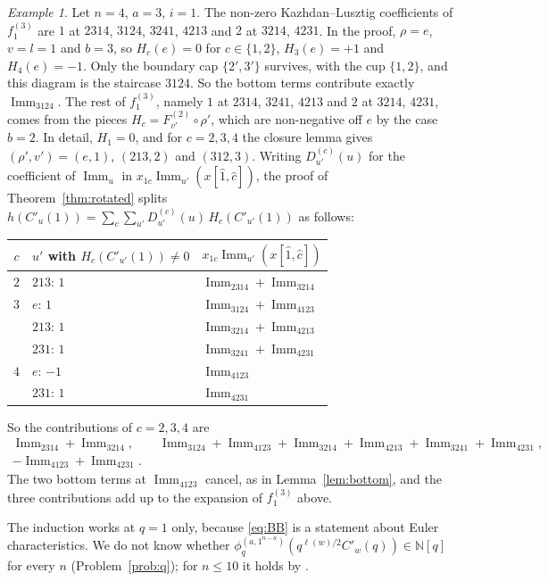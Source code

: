 \documentclass[11pt]{amsart}
\theoremstyle{definition}
\theoremstyle{remark}
\newtheorem{exa}{Example}[section]
\newcommand{\N}{\mathbb{N}}
\newcommand{\Imm}{\operatorname{Imm}}
\newcommand{\Cp}[1]{C'_{#1}(1)}
\begin{document}
\begin{exa}\label{ex:n4}
Let $n=4$, $a=3$, $i=1$. The non-zero Kazhdan--Lusztig coefficients of $f^{(3)}_1$ are $1$ at $2314$, $3124$, $3241$, $4213$ and $2$ at $3214$, $4231$. In the proof, $\rho=e$, $v=l=1$ and $b=3$, so $H_c(e)=0$ for $c\in\{1,2\}$, $H_3(e)=+1$ and $H_4(e)=-1$. Only the boundary cap $\{2',3'\}$ survives, with the cup $\{1,2\}$, and this diagram is the staircase $3124$. So the bottom terms contribute exactly $\Imm_{3124}$. The rest of $f^{(3)}_1$, namely $1$ at $2314$, $3241$, $4213$ and $2$ at $3214$, $4231$, comes from the pieces $H_c=F^{(2)}_{v'}\circ\rho'$, which are non-negative off $e$ by the case $b=2$. In detail, $H_1=0$, and for $c=2,3,4$ the closure lemma gives $(\rho',v')=(e,1)$, $(213,2)$ and $(312,3)$. Writing $D^{(c)}_{u'}(u)$ for the coefficient of $\Imm_u$ in $x_{1c}\Imm_{u'}(x[\hat1,\hat c])$, the proof of Theorem~\ref{thm:rotated} splits $h(\Cp u)=\sum_c\sum_{u'}D^{(c)}_{u'}(u)\,H_c(\Cp{u'})$ as follows:
\begin{center}
\begin{tabular}{cll}
\toprule
$c$ & $u'$ with $H_c(\Cp{u'})\ne0$ & $x_{1c}\Imm_{u'}(x[\hat1,\hat c])$\\
\midrule
$2$ & $213$: $1$ & $\Imm_{2314}+\Imm_{3214}$\\
$3$ & $e$: $1$ & $\Imm_{3124}+\Imm_{4123}$\\
 & $213$: $1$ & $\Imm_{3214}+\Imm_{4213}$\\
 & $231$: $1$ & $\Imm_{3241}+\Imm_{4231}$\\
$4$ & $e$: $-1$ & $\Imm_{4123}$\\
 & $231$: $1$ & $\Imm_{4231}$\\
\bottomrule
\end{tabular}
\end{center}
So the contributions of $c=2,3,4$ are
\begin{gather*}
\Imm_{2314}+\Imm_{3214},\qquad \Imm_{3124}+\Imm_{4123}+\Imm_{3214}+\Imm_{4213}+\Imm_{3241}+\Imm_{4231},\\
-\Imm_{4123}+\Imm_{4231}.
\end{gather*}
The two bottom terms at $\Imm_{4123}$ cancel, as in Lemma~\ref{lem:bottom}, and the three contributions add up to the expansion of $f^{(3)}_1$ above.
\end{exa}

The induction works at $q=1$ only, because \eqref{eq:BB} is a statement about Euler characteristics. We do not know whether $\phi^{(a,1^{n-a})}_q(q^{\ell(w)/2}C'_w(q))\in\N[q]$ for every $n$ (Problem~\ref{prob:q}); for $n\le10$ it holds by \cite{McN}.
\end{document}
